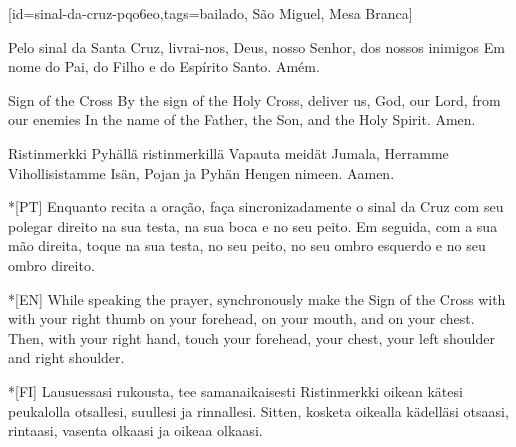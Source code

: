 %


\renewcommand{\theulSongNumber}{\Roman{ulSongNumber}}
\setcounter{ulSongNumber}{1}


[id={sinal-da-cruz-pqo6eo},tags={bailado, São Miguel, Mesa Branca}]
  \begin{passage}[PT]{}\obeylines
    Pelo sinal da Santa Cruz,
    livrai-nos, Deus, nosso Senhor,
    dos nossos inimigos
    \polpar
    Em nome do Pai, do Filho e do Espírito Santo.
    \polpar
    Amém.
  \end{passage}
  \begin{passage}[EN]{Sign of the Cross}\obeylines
    By the sign of the Holy Cross,
    deliver us, God, our Lord,
    from our enemies
    \polpar
    In the name of the Father, the Son, and the Holy Spirit.
    \polpar
    Amen.
  \end{passage}
  \begin{passage}[FI]{Ristinmerkki}\obeylines
    Pyhällä ristinmerkillä
    Vapauta meidät Jumala, Herramme
    Vihollisistamme
    \polpar
    Isän, Pojan ja Pyhän Hengen nimeen.
    \polpar
    Aamen.
  \end{passage}
  \hardbrk
  \vspace*{\fill}
  \begin{passage}*[PT]{}\obeylines
    Enquanto recita a oração, faça sincronizadamente
    o sinal da Cruz com seu polegar direito
    na sua testa,
    na sua boca e
    no seu peito.
    \polpar
    Em seguida, com a sua mão direita, toque
    na sua testa,
    no seu peito,
    no seu ombro esquerdo e no seu ombro direito.
  \end{passage}
  \begin{passage}*[EN]{}\obeylines
    While speaking the prayer, synchronously make
    the Sign of the Cross with with your right thumb
    on your forehead,
    on your mouth, and
    on your chest.
    \polpar
    Then, with your right hand, touch
    your forehead,
    your chest,
    your left shoulder and right shoulder.
  \end{passage}
  \begin{passage}*[FI]{}\obeylines
    Lausuessasi rukousta, tee samanaikaisesti
    Ristinmerkki oikean kätesi peukalolla
    otsallesi,
    suullesi ja
    rinnallesi.
    \polpar
    Sitten, kosketa oikealla kädelläsi
    otsaasi,
    rintaasi,
    vasenta olkaasi ja oikeaa olkaasi.
  \end{passage}
  \vspace*{\fill}
\endsong


